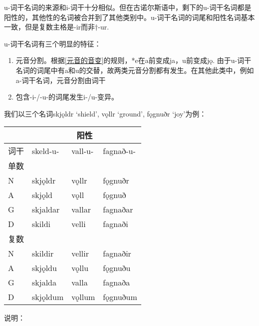 u-词干名词的来源和i-词干十分相似。但在古诺尔斯语中，剩下的u-词干名词都是阳性的，其他性的名词被合并到了其他类别中。u-词干名词的词尾和阳性名词基本一致，但是复数主格是-ir而非†-ur.

u-词干名词有三个明显的特征：

\begin{enumerate}
  \def\labelenumi{\arabic{enumi})}
  \item
        元音分割。根据\ref{元音的音变}的规则，*e在a前变成ja，u前变成jǫ.
        由于u-词干名词的词尾中有a和u的交替，故两类元音分割都有发生。在其他此类中，例如a-词干名词，元音分割由词干
  \item
        包含-i-/-u-的词尾发生i-/u-变异。
\end{enumerate}

我们以三个名词skjǫldr `shield', vǫllr `ground', fǫgnuðr `joy'为例：

\begin{longtable}{llll}
  \toprule
       & \multicolumn{3}{c}{阳性}                       \\
  \midrule
  \endhead
  \bottomrule
  \endfoot
  词干 & skeld-u-                 & vall-u- & fagnað-u- \\
  单数 &                          &         &           \\
  N    & skjǫldr                  & vǫllr   & fǫgnuðr   \\
  A    & skjǫld                   & vǫll    & fǫgnuð    \\
  G    & skjaldar                 & vallar  & fagnaðar  \\
  D    & skildi                   & velli   & fagnaði   \\
  复数 &                          &         &           \\
  N    & skildir                  & vellir  & fagnaðir  \\
  A    & skjǫldu                  & vǫllu   & fǫgnuðu   \\
  G    & skjalda                  & valla   & fagnaða   \\
  D    & skjǫldum                 & vǫllum  & fǫgnuðum  \\
\end{longtable}

说明：

